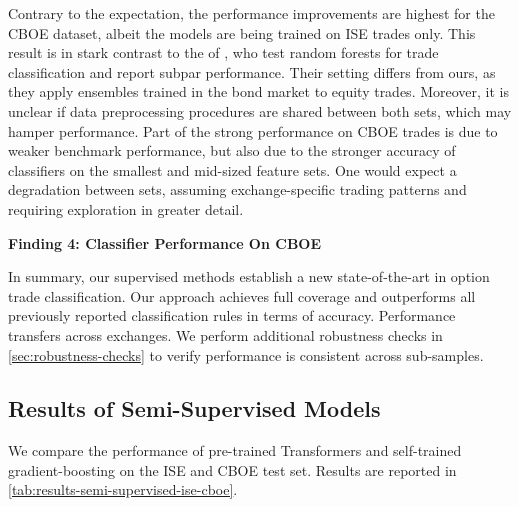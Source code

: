 Contrary to the expectation, the performance improvements are highest for the \gls{CBOE} dataset, albeit the models are being trained on \gls{ISE} trades only. This result is in stark contrast to the of \textcite[][32]{ronenMachineLearningTrade2022}, who test random forests for trade classification and report subpar performance. Their setting differs from ours, as they apply ensembles trained in the bond market to equity trades. Moreover, it is unclear if data preprocessing procedures are shared between both sets, which may hamper performance. Part of the strong performance on \gls{CBOE} trades is due to weaker benchmark performance, but also due to the stronger accuracy of classifiers on the smallest and mid-sized feature sets. One would expect a degradation between sets, assuming exchange-specific trading patterns and requiring exploration in greater detail.

\textbf{Finding 4: Classifier Performance On \gls{CBOE}}



In summary, our supervised methods establish a new state-of-the-art in option trade classification. Our approach achieves full coverage and outperforms all previously reported classification rules in terms of accuracy. Performance transfers across exchanges. We perform additional robustness checks in \cref{sec:robustness-checks} to verify performance is consistent across sub-samples.

\subsection{Results of Semi-Supervised
    Models}\label{sec:results-of-semi-supervised-models}

We compare the performance of pre-trained Transformers and self-trained gradient-boosting on the \gls{ISE} and \gls{CBOE} test set. Results are reported in \cref{tab:results-semi-supervised-ise-cboe}.

